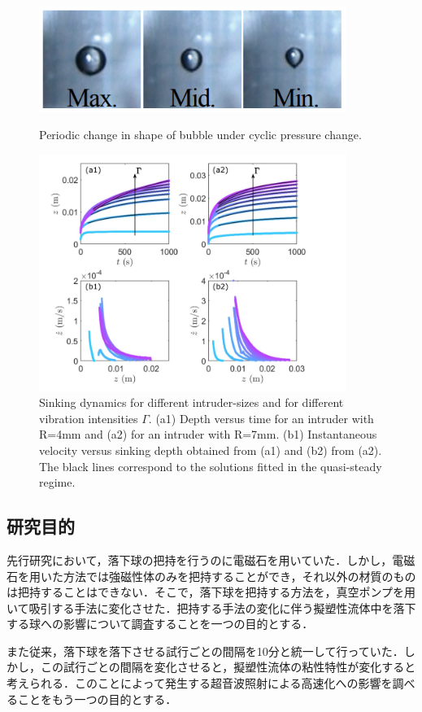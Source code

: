 \begin{center}
    \begin{figure}[h]
        \centering
        \includegraphics[width=10.0cm,clip]{1-Background/3-bubble.png}
        \caption{Periodic change in shape of bubble under cyclic pressure change\cite{ref:5}.}
        \label{fig:3-bubble}
        \centering
        \includegraphics[width=10.0cm,clip]{1-Background/4-sinking.png}
        \caption{Sinking dynamics for different intruder-sizes and for different vibration intensities $\Gamma$. (a1) Depth versus time for an intruder with R=4mm and (a2) for an intruder with R=7mm. (b1) Instantaneous velocity versus sinking depth obtained from (a1) and (b2) from (a2). The black lines correspond to the solutions fitted in the quasi-steady regime\cite{ref:6}.}
        \label{fig:4-sinking}
    \end{figure}
\end{center}

\subsection{研究目的}

先行研究\cite{ref:8}において，落下球の把持を行うのに電磁石を用いていた．しかし，電磁石を用いた方法では強磁性体のみを把持することができ，それ以外の材質のものは把持することはできない．そこで，落下球を把持する方法を，真空ポンプを用いて吸引する手法に変化させた．把持する手法の変化に伴う擬塑性流体中を落下する球への影響について調査することを一つの目的とする．

また従来，落下球を落下させる試行ごとの間隔を10分と統一して行っていた．しかし，この試行ごとの間隔を変化させると，擬塑性流体の粘性特性が変化すると考えられる．このことによって発生する超音波照射による高速化への影響を調べることをもう一つの目的とする．
